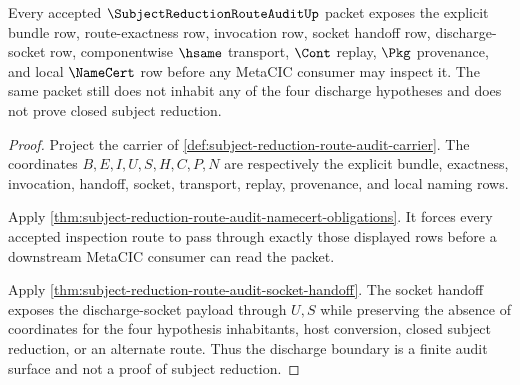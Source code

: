 \begin{theorem}
\label{thm:subject-reduction-route-audit-discharge-boundary}
Every accepted $\SubjectReductionRouteAuditUp$ packet exposes the explicit bundle row, route-exactness row, invocation row, socket handoff row, discharge-socket row, componentwise $\hsame$ transport, $\Cont$ replay, $\Pkg$ provenance, and local $\NameCert$ row before any MetaCIC consumer may inspect it. The same packet still does not inhabit any of the four discharge hypotheses and does not prove closed subject reduction.
\end{theorem}
\begin{proof}
Project the carrier of \autoref{def:subject-reduction-route-audit-carrier}. The coordinates $B,E,I,U,S,H,C,P,N$ are respectively the explicit bundle, exactness, invocation, handoff, socket, transport, replay, provenance, and local naming rows.

Apply \autoref{thm:subject-reduction-route-audit-namecert-obligations}. It forces every accepted inspection route to pass through exactly those displayed rows before a downstream MetaCIC consumer can read the packet.

Apply \autoref{thm:subject-reduction-route-audit-socket-handoff}. The socket handoff exposes the discharge-socket payload through $U,S$ while preserving the absence of coordinates for the four hypothesis inhabitants, host conversion, closed subject reduction, or an alternate route. Thus the discharge boundary is a finite audit surface and not a proof of subject reduction.
\end{proof}

